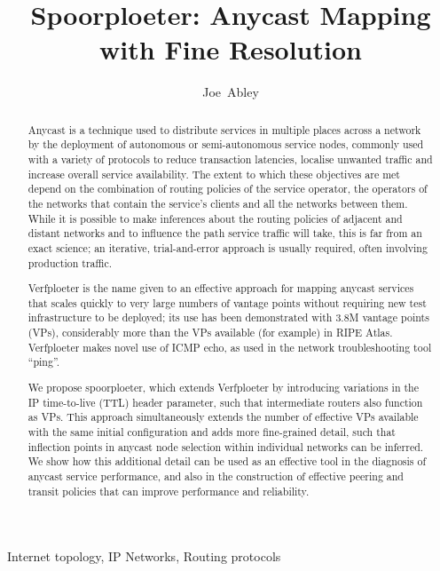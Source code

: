 \documentclass[9pt,technote,letterpaper]{IEEEtran}
\begin{document}
\title{Spoorploeter: Anycast Mapping with Fine Resolution}

\author{Joe~Abley}

\pagestyle{headings}

\begin{abstract}
Anycast is a technique used to distribute services in multiple places across a network by the deployment of autonomous or semi-autonomous service nodes, commonly used with a variety of protocols to reduce transaction latencies, localise unwanted traffic and increase overall service availability. The extent to which these objectives are met depend on the combination of routing policies of  the service operator, the operators of the networks that contain the service's clients and all the networks between them. While it is possible to make inferences about the routing policies of adjacent and distant networks and to influence the path service traffic will take, this is far from an exact science; an iterative, trial-and-error approach is usually required, often involving production traffic.

Verfploeter is the name given to an effective approach for mapping anycast services that scales quickly to very large numbers of vantage points without requiring new test infrastructure to be deployed; its use has been demonstrated with 3.8M vantage points (VPs), considerably more than the VPs available (for example) in RIPE Atlas. Verfploeter makes novel use of ICMP echo, as used in the network troubleshooting tool ``ping''.

We propose spoorploeter, which extends Verfploeter by introducing variations in the IP time-to-live (TTL) header parameter, such that intermediate routers also function as VPs. This approach simultaneously extends the number of effective VPs available with the same initial configuration and adds more fine-grained detail, such that  inflection points in anycast node selection within individual networks can be inferred. We show how this additional detail can be used as an effective tool in the diagnosis of anycast service performance, and also in the construction of effective peering and transit policies that can improve performance and reliability.
\end{abstract}

\begin{IEEEkeywords}
Internet topology, IP Networks, Routing protocols
\end{IEEEkeywords}

\maketitle
\end{document}
